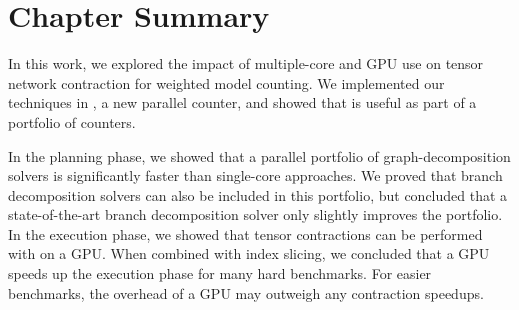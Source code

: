 \section{Chapter Summary}
In this work, we explored the impact of multiple-core and GPU use on tensor network contraction for weighted model counting. We implemented our techniques in , a new parallel counter, and showed that  is useful as part of a portfolio of counters.

In the planning phase, we showed that a parallel portfolio of graph-decomposition solvers is significantly faster than single-core approaches. We proved that branch decomposition solvers can also be included in this portfolio, but concluded that a state-of-the-art branch decomposition solver only slightly improves the portfolio. In the execution phase, we showed that tensor contractions can be performed with  on a GPU. When combined with index slicing, we concluded that a GPU speeds up the execution phase for many hard benchmarks. For easier benchmarks, the overhead of a GPU may outweigh any contraction speedups. 
